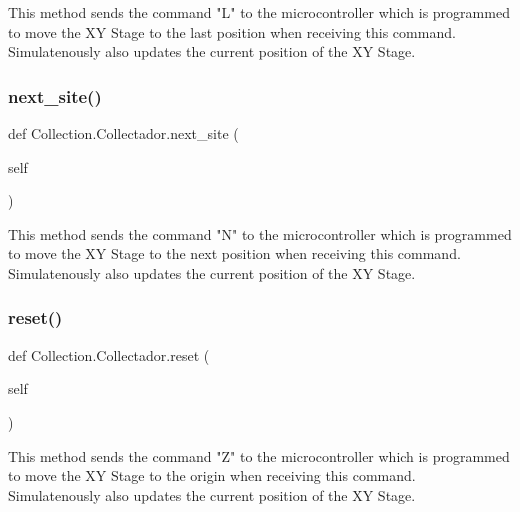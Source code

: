 \begin{DoxyVerb}This method sends the command "L" to the microcontroller which is programmed to move the XY Stage to the last position when receiving this command.
Simulatenously also updates the current position of the XY Stage.
\end{DoxyVerb}
 \mbox{\label{class_collection_1_1_collectador_aa156ce605af4adfec1bfb7aa8447eb65}} 
\subsubsection{\texorpdfstring{next\_site()}{next\_site()}}
{\footnotesize\ttfamily def Collection.\+Collectador.\+next\+\_\+site (\begin{DoxyParamCaption}\item[{}]{self }\end{DoxyParamCaption})}

\begin{DoxyVerb}This method sends the command "N" to the microcontroller which is programmed to move the XY Stage to the next position when receiving this command.
Simulatenously also updates the current position of the XY Stage.
\end{DoxyVerb}
 \mbox{\label{class_collection_1_1_collectador_ada8c768e4da16031fe01afcef78957e1}} 
\subsubsection{\texorpdfstring{reset()}{reset()}}
{\footnotesize\ttfamily def Collection.\+Collectador.\+reset (\begin{DoxyParamCaption}\item[{}]{self }\end{DoxyParamCaption})}

\begin{DoxyVerb}This method sends the command "Z" to the microcontroller which is programmed to move the XY Stage to the origin when receiving this command.
Simulatenously also updates the current position of the XY Stage.
\end{DoxyVerb}
 \mbox{\label{class_collection_1_1_collectador_a06c63ef23395dbbc8975e407500ed593}} 
